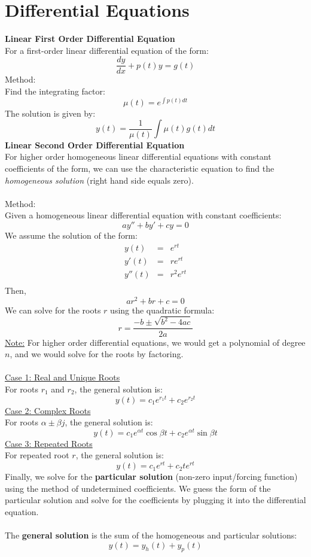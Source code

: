 \documentclass[12pt]{article}
\begin{document}
\section*{Differential Equations}
\textbf{Linear First Order Differential Equation}\\
For a first-order linear differential equation of the form:
\[\frac{dy}{dx} + p(t)y = g(t)\]
Method:\\
Find the integrating factor:
\[\boxed{\mu(t) = e^{\int p(t) dt}}\]
The solution is given by:
\[\boxed{y(t) = \frac{1}{\mu(t)}\int \mu(t)g(t) dt}\]
\textbf{Linear Second Order Differential Equation}\\
For higher order homogeneous linear differential equations with constant coefficients of the form, we can use the characteristic equation to find the \textit{homogeneous solution} (right hand side equals zero).\\\\
Method:\\
Given a homogeneous linear differential equation with constant coefficients:
\[ay'' + by' + cy = 0\]
We assume the solution of the form:
\vspace{-1em}
\begin{eqnarray*}
y(t) &=& e^{rt}\\
y'(t) &=& re^{rt}\\
y''(t) &=& r^{2}e^{rt}\\
\end{eqnarray*}
Then,  
\vspace{-1em}
\[ar^{2}+br+c=0\]
We can solve for the roots $r$ using the quadratic formula:
\[r=\frac{-b\pm\sqrt{b^2-4ac}}{2a}\]
\underline{Note:} For higher order differential equations, we would get a polynomial of degree $n$, and we would solve for the roots by factoring.\\\\
\underline{Case 1: Real and Unique Roots}\\
For roots $r_1$ and $r_2$, the general solution is:
\[\boxed{y(t) = c_1 e^{r_1 t} + c_2 e^{r_2 t}}\]
\underline{Case 2: Complex Roots}\\
For roots $\alpha \pm \beta j$, the general solution is:
\[\boxed{y(t) =   c_1 e^{\alpha t}\cos \beta t + c_2 e^{\alpha t} \sin \beta t}\]
\underline{Case 3: Repeated Roots}\\
For repeated root $r$, the general solution is:
\[\boxed{y(t) = c_1 e^{r t} + c_2 t e^{r t}}\]
Finally, we solve for the \textbf{particular solution} (non-zero input/forcing function) using the method of undetermined coefficients. We guess the form of the particular solution and solve for the coefficients by plugging it into the differential equation.\\\\
The \textbf{general solution} is the sum of the homogeneous and particular solutions:
\[\boxed{y(t) = y_h(t) + y_p(t)}\]
\end{document}
